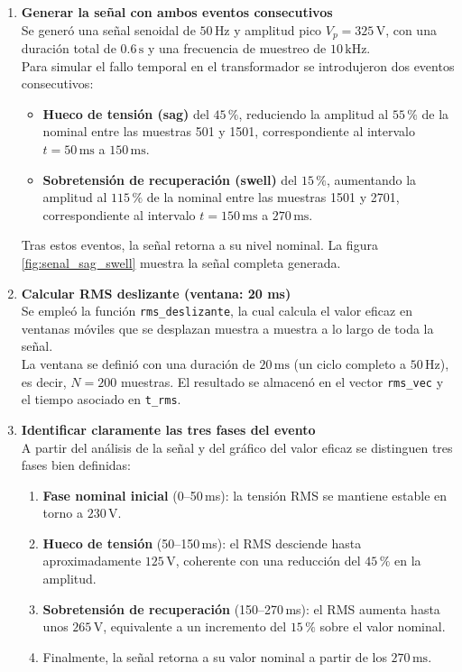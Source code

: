 \documentclass{article}
\begin{document}
\begin{enumerate}
    \item \textbf{Generar la señal con ambos eventos consecutivos} \\
    Se generó una señal senoidal de $50\,\text{Hz}$ y amplitud pico $V_p = 325\,\text{V}$, con una duración total de $0.6\,\text{s}$ y una frecuencia de muestreo de $10\,\text{kHz}$. \\
    Para simular el fallo temporal en el transformador se introdujeron dos eventos consecutivos:
    \begin{itemize}
        \item \textbf{Hueco de tensión (sag)} del $45\,\%$, reduciendo la amplitud al $55\,\%$ de la nominal entre las muestras 501 y 1501, correspondiente al intervalo $t = 50\,\text{ms}$ a $150\,\text{ms}$.
        \item \textbf{Sobretensión de recuperación (swell)} del $15\,\%$, aumentando la amplitud al $115\,\%$ de la nominal entre las muestras 1501 y 2701, correspondiente al intervalo $t = 150\,\text{ms}$ a $270\,\text{ms}$.
    \end{itemize}
    Tras estos eventos, la señal retorna a su nivel nominal. La figura \ref{fig:senal_sag_swell} muestra la señal completa generada.

    \item \textbf{Calcular RMS deslizante (ventana: 20 ms)} \\
    Se empleó la función \texttt{rms\_deslizante}, la cual calcula el valor eficaz en ventanas móviles que se desplazan muestra a muestra a lo largo de toda la señal. \\
    La ventana se definió con una duración de $20\,\text{ms}$ (un ciclo completo a $50\,\text{Hz}$), es decir, $N = 200$ muestras. El resultado se almacenó en el vector \texttt{rms\_vec} y el tiempo asociado en \texttt{t\_rms}.

    \item \textbf{Identificar claramente las tres fases del evento} \\
    A partir del análisis de la señal y del gráfico del valor eficaz     se distinguen tres fases bien definidas:
    \begin{enumerate}
        \item \textbf{Fase nominal inicial} (0--50\,ms): la tensión RMS se mantiene estable en torno a $230\,\text{V}$.
        \item \textbf{Hueco de tensión} (50--150\,ms): el RMS desciende hasta aproximadamente $125\,\text{V}$, coherente con una reducción del $45\,\%$ en la amplitud.
        \item \textbf{Sobretensión de recuperación} (150--270\,ms): el RMS aumenta hasta unos $265\,\text{V}$, equivalente a un incremento del $15\,\%$ sobre el valor nominal.
        \item Finalmente, la señal retorna a su valor nominal a partir de los $270\,\text{ms}$.



\end{enumerate}
\end{enumerate}
\end{document}
